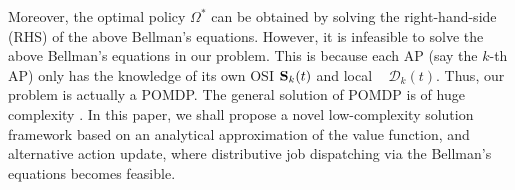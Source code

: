 Moreover, the optimal policy $\Omega^{*}$ can be obtained by solving the right-hand-side (RHS) of the above Bellman's equations.
However, it is infeasible to solve the above Bellman's equations in our problem.
This is because each AP (say the $k$-th AP) only has the knowledge of its own OSI $\mathbf{S}_{k}(t)$ and local \brlatency~ $\mathcal{D}_{k}(t)$.
Thus, our problem is actually a POMDP.
The general solution of POMDP is of huge complexity \cite{IJCAI03-NairR,IJCAI99-BoutilierC}.
In this paper, we shall propose a novel low-complexity solution framework based on an analytical approximation of the value function, and alternative action update, where distributive job dispatching via the Bellman's equations becomes feasible.
